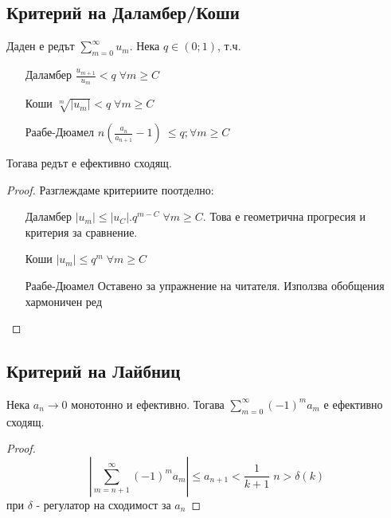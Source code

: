 \subsection{Критерий на Даламбер/Коши}
\begin{proposition}
    Даден е редът $\sum\limits_{m=0}^\infty u_m$. Нека $q \in (0; 1)$, т.ч.
    \begin{itemize}
        \item[Даламбер] $\frac{u_{m+1}}{u_m} < q\; \forall m \geq C$
        \item[Коши] $\sqrt[m]{|u_m|} < q\; \forall m \geq C$
        \item[Раабе-Дюамел] $n\left(\frac{a_n}{a_{n+1}} - 1\right)\ \leq q; \forall m \geq C$
    \end{itemize}
    Тогава редът е ефективно сходящ.
\end{proposition}
\begin{proof}
    Разглеждаме критериите поотделно:
    \begin{itemize}
        \item[Даламбер] $|u_m| \leq |u_C|.q^{m-C} \; \forall m \geq C$. Това е геометрична прогресия и критерия за сравнение.
        \item[Коши] $|u_m| \leq q^m\; \forall m \geq C$
        \item[Раабе-Дюамел] Оставено за упражнение на читателя. Използва обобщения хармоничен ред
    \end{itemize}
\end{proof}

\subsection{Критерий на Лайбниц}
\begin{proposition}
    Нека $a_n \rightarrow 0$ монотонно и ефективно. Тогава $\sum\limits_{m=0}^\infty (-1)^m a_m$ е ефективно сходящ.
\end{proposition}
\begin{proof}
    \begin{equation*}
        \left| \sum\limits_{m=n+1}^\infty (-1)^m a_m\right| \leq a_{n+1} < \frac{1}{k+1}\; n > \delta(k)
    \end{equation*}
    при $\delta$ - регулатор на сходимост за $a_n$
\end{proof}